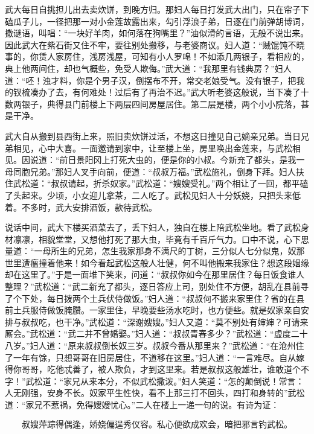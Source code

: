 武大每日自挑担儿出去卖炊饼，到晚方归。那妇人每日打发武大出门，只在帘子下磕瓜子儿，一径把那一对小金莲故露出来，勾引浮浪子弟，日逐在门前弹胡博词，撒谜语，叫唱：“一块好羊肉，如何落在狗嘴里？”油似滑的言语，无般不说出来。因此武大在紫石街又住不牢，要往别处搬移，与老婆商议。妇人道：“贼馄饨不晓事的，你赁人家房住，浅房浅屋，可知有小人罗唣！不如添几两银子，看相应的，典上他两间住，却也气概些，免受人欺侮。”武大道：“我那里有钱典房？”妇人道：“呸！浊才料，你是个男子汉，倒摆布不开，常交老娘受气。没有银子，把我的钗梳凑办了去，有何难处！过后有了再治不迟。”武大听老婆这般说，当下凑了十数两银子，典得县门前楼上下两层四间房屋居住。第二层是楼，两个小小院落，甚是干净。

武大自从搬到县西街上来，照旧卖炊饼过活，不想这日撞见自己嫡亲兄弟。当日兄弟相见，心中大喜。一面邀请到家中，让至楼上坐，房里唤出金莲来，与武松相见。因说道：“前日景阳冈上打死大虫的，便是你的小叔。今新充了都头，是我一母同胞兄弟。”那妇人叉手向前，便道：“叔叔万福。”武松施礼，倒身下拜。妇人扶住武松道：“叔叔请起，折杀奴家。”武松道：“嫂嫂受礼。”两个相让了一回，都平磕了头起来。少顷，小女迎儿拿茶，二人吃了。武松见妇人十分妖娆，只把头来低着。不多时，武大安排酒饭，款待武松。

说话中间，武大下楼买酒菜去了，丢下妇人，独自在楼上陪武松坐地。看了武松身材凛凛，相貌堂堂，又想他打死了那大虫，毕竟有千百斤气力。口中不说，心下思量道：“一母所生的兄弟，怎生我家那身不满尺的丁树，三分似人七分似鬼，奴那世里遭瘟撞着他来！如今看起武松这般人壮健，何不叫他搬来我家住？想这段姻缘却在这里了。”于是一面堆下笑来，问道：“叔叔你如今在那里居住？每日饭食谁人整理？”武松道：“武二新充了都头，逐日答应上司，别处住不方便，胡乱在县前寻了个下处，每日拨两个土兵伏侍做饭。”妇人道：“叔叔何不搬来家里住？省的在县前土兵服侍做饭腌臜。一家里住，早晚要些汤水吃时，也方便些。就是奴家亲自安排与叔叔吃，也干净。”武松道：“深谢嫂嫂。”妇人又道：“莫不别处有婶婶？可请来厮会。”武松道：“武二并不曾婚娶。”妇人道：“叔叔青春多少？”武松道：“虚度二十八岁。”妇人道：“原来叔叔倒长奴三岁。叔叔今番从那里来？”武松道：“在沧州住了一年有馀，只想哥哥在旧房居住，不道移在这里。”妇人道：“一言难尽。自从嫁得你哥哥，吃他忒善了，被人欺负，才到这里来。若是叔叔这般雄壮，谁敢道个不字！”武松道：“家兄从来本分，不似武松撒泼。”妇人笑道：“怎的颠倒说！常言：人无刚强，安身不长。奴家平生性快，看不上那三打不回头，四打和身转的”武松道：“家兄不惹祸，免得嫂嫂忧心。”二人在楼上一递一句的说。有诗为证：

\[
叔嫂萍踪得偶逢，娇娆偏逞秀仪容。
私心便欲成欢会，暗把邪言钓武松。
\]

